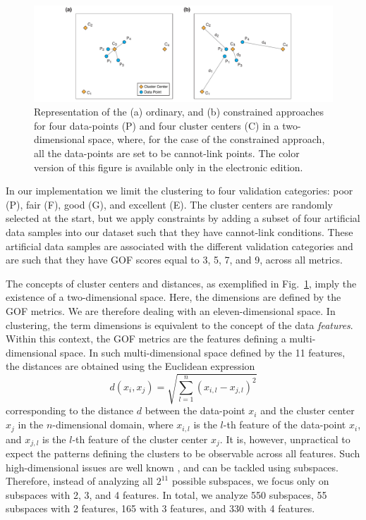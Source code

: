 \begin{figure}[t]
	\centering
	\includegraphics[width=\textwidth]{figures/pdf/figure-04}
	\caption{Representation of the (a) ordinary, and (b) constrained \kmeans{} approaches for four data-points (P) and four cluster centers (C) in a two-dimensional space, where, for the case of the constrained \kmeans{} approach, all the data-points are set to be cannot-link points. The color version of this figure is available only in the electronic edition.}
	\label{fig:k-means}
\end{figure}

In our implementation we limit the clustering to four validation categories: poor (P), fair (F), good (G), and excellent (E). The cluster centers are randomly selected at the start, but we apply constraints by adding a subset of four artificial data samples into our dataset such that they have cannot-link conditions. These artificial data samples are associated with the different validation categories and are such that they have GOF scores equal to 3, 5, 7, and 9, across all metrics.

The concepts of cluster centers and distances, as exemplified in Fig.~\ref{fig:k-means}, imply the existence of a two-dimensional space. Here, the dimensions are defined by the GOF metrics. We are therefore dealing with an eleven-dimensional space. In clustering, the term dimensions is equivalent to the concept of the data \textit{features}. Within this context, the GOF metrics are the features defining a multi-dimensional space. In such multi-dimensional space defined by the 11 features, the distances are obtained using the Euclidean expression
%
\begin{equation}
	d(x_i, x_j) = \sqrt{ \sum_{l=1}^{n} \left( x_{i,l} - x_{j,l} \right)^2 }
\end{equation}
%
corresponding to the distance $d$ between the data-point $x_i$ and the cluster center $x_j$ in the $n$-dimensional domain, where $x_{i,l}$ is the $l$-th feature of the data-point $x_i$, and $x_{j,l}$ is the $l$-th feature of the cluster center $x_j$. It is, however, unpractical to expect the patterns defining the clusters to be observable across all features. Such high-dimensional issues are well known \citep[see, for instance,][]{Parsons_2004_ACM, Dy_2004_MLR}, and can be tackled using subspaces. Therefore, instead of analyzing all $2^{11}$ possible subspaces, we focus only on subspaces with 2, 3, and 4 features. In total, we analyze 550 subspaces, 55 subspaces with 2 features, 165 with 3 features, and 330 with 4 features.

